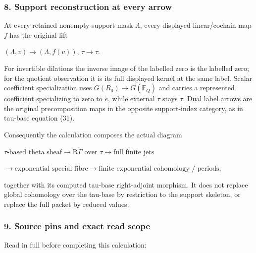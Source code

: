 \documentclass{article}
\begin{document}
\subsubsection{8. Support reconstruction at every arrow}\label{endpoint-f1_scaling--support-reconstruction-at-every-arrow}

At every retained nonempty support mask \(\Lambda\), every displayed linear/cochain map \(f\) has the original lift

\((\Lambda,v)\to (\Lambda,f(v))\), \(\tau\to \tau\).

For invertible dilations the inverse image of the labelled zero is the labelled zero; for the quotient observation it is its full displayed kernel at the same label. Scalar coefficient specialization uses \(G(R_0)\to G(\mathbb F_Q)\) and carries a represented coefficient specializing to zero to \(e\), while external \(\tau\) stays \(\tau\). Dual label arrows are the original precomposition maps in the opposite support-index category, as in tau-base equation (31).

Consequently the calculation composes the actual diagram

\(\tau\text{-based theta sheaf}\to\mathrm R\Gamma\text{ over }\tau\to\text{full finite jets}\)

\(\to\text{exponential special fibre}\to\text{finite exponential cohomology / periods}\),

together with its computed tau-base right-adjoint morphism. It does not replace global cohomology over the tau-base by restriction to the support skeleton, or replace the full packet by reduced values.

\subsubsection{9. Source pins and exact read scope}\label{endpoint-f1_scaling--source-pins-and-exact-read-scope}

Read in full before completing this calculation:
\end{document}
